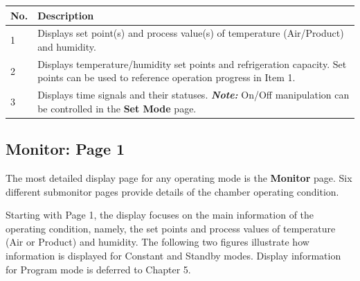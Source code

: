 \begin{longtable}[]{@{}ll@{}}
\toprule
\begin{minipage}[b]{0.07\columnwidth}\raggedright
No.\strut
\end{minipage} & \begin{minipage}[b]{0.88\columnwidth}\raggedright
Description\strut
\end{minipage}\tabularnewline
\midrule
\endhead
\begin{minipage}[t]{0.07\columnwidth}\raggedright
1\strut
\end{minipage} & \begin{minipage}[t]{0.88\columnwidth}\raggedright
Displays set point(s) and process value(s) of temperature (Air/Product)
and humidity.\strut
\end{minipage}\tabularnewline
\begin{minipage}[t]{0.07\columnwidth}\raggedright
2\strut
\end{minipage} & \begin{minipage}[t]{0.88\columnwidth}\raggedright
Displays temperature/humidity set points and refrigeration capacity. Set
points can be used to reference operation progress in Item 1.\strut
\end{minipage}\tabularnewline
\begin{minipage}[t]{0.07\columnwidth}\raggedright
3\strut
\end{minipage} & \begin{minipage}[t]{0.88\columnwidth}\raggedright
Displays time signals and their statuses. \textbf{\emph{Note:}} On/Off
manipulation can be controlled in the \textbf{Set Mode} page.\strut
\end{minipage}\tabularnewline
\bottomrule
\end{longtable}


\subsection{Monitor: Page 1}

The most detailed display page for any operating mode is the
\textbf{Monitor} page. Six different submonitor pages provide details of
the chamber operating condition.

Starting with Page 1, the display focuses on the main information of the
operating condition, namely, the set points and process values of
temperature (Air or Product) and humidity. The following two figures
illustrate how information is displayed for Constant and Standby modes.
Display information for Program mode is deferred to Chapter 5.

